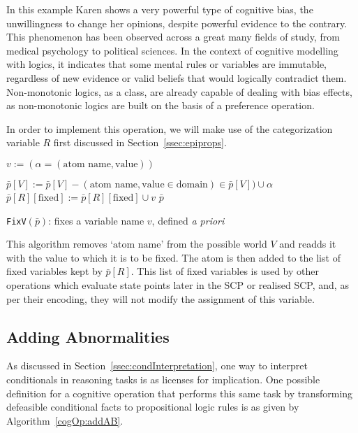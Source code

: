 In this example Karen shows a very powerful type of cognitive bias, the unwillingness to change her opinions, despite powerful evidence to the contrary. This phenomenon has been observed across a great many fields of study, from medical psychology \citep{brown2010omission} \citep{wroe2005feeling} to political sciences\citep{tappin2017heart}. In the context of cognitive modelling with logics, it indicates that some mental rules or variables are immutable, regardless of new evidence or valid beliefs that would logically contradict them. Non-monotonic logics, as a class, are already capable of dealing with bias effects, as non-monotonic logics are built on the basis of a preference operation.

In order to implement this operation, we will make use of the categorization variable $R$ first discussed in Section~\ref{ssec:epiprops}.

\begin{algorithm}[H] \label{cogOp:fixV}
\SetAlgoLined
{}
$v:= (\alpha = (\text{atom name}, \text{value}))$\;

{
$\bar{p}[V]:=\bar{p}[V] - (\text{atom name}, \text{value} \in \text{domain}) \in \bar{p}[V]) \cup \alpha$\;
$\bar{p}[R][\text{fixed}]:= \bar{p}[R][\text{fixed}] \cup v$\;
\Return $\bar{p}$
}

\caption{\texttt{FixV}$(\bar{p})$: fixes a variable name $v$, defined \textit{a priori}}
\end{algorithm}


This algorithm removes `$\text{atom name}$' from the possible world $V$ and readds it with the value to which it is to be fixed. The atom is then added to the list of fixed variables kept by $\bar{p}[R]$. This list of fixed variables is used by other operations which evaluate state points later in the SCP or realised SCP, and, as per their encoding, they will not modify the assignment of this variable.

\subsection{Adding Abnormalities}

As discussed in Section~\ref{ssec:condInterpretation}, one way to interpret conditionals in reasoning tasks is as licenses for implication. One possible definition for a cognitive operation that performs this same task by transforming defeasible conditional facts to propositional logic rules is as given by Algorithm~\ref{cogOp:addAB}.

